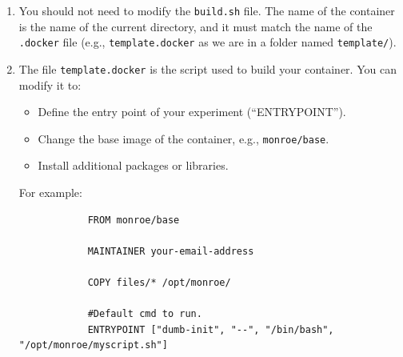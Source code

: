 \documentclass[a4paper,10pt]{article}
\newcommand{\VerbatimFont}{\footnotesize}
\newcommand{\monroe}{MONROE}
\newcommand{\identifier}[1]{{\texttt{\small{#1}}}}
\begin{document}
\begin{enumerate}
		Here, you will find the required files to prepare your image based on \monroe{}'s base.
		You should care about four things: a) The contents of the \identifier{files/} folder, b) the \identifier{build.sh} file, c) the \identifier{push.sh} file and d) the \identifier{template.docker} script file that describes how to create your container.
		In the directory \identifier{files/} you can put all the files that are part of your experiment.
		As a simple example, we can use the following script:
		{\VerbatimFont\begin{verbatim}
			$vi files/myscript.sh
			  #!/bin/bash
			  ls -lah > /monroe/results/listing.txt
		\end{verbatim}}
		Any files that your experiment creates in \identifier{/monroe/results} are delivered to the repository, where you will be able to retrieve them.
		\emph{Writes to any other part of the filesystem will be lost once the experiment is finished.}
		In periodic schedules, no data will survive from one execution to the next (i.e., the container is loaded fresh before each execution).
		If result persistence is needed, the experimenter will have to supply it by downloading the needed files from the network during the experiment itself.
	\item You should not need to modify the \identifier{build.sh} file. The name of the container is the name of the current directory, and it must match the name of the \identifier{.docker} file (e.g., \identifier{template.docker} as we are in a folder named \identifier{template/}).
	
	\item The file \identifier{template.docker} is the script used to build your container.
		You can modify it to:
		\begin{itemize}
			\item Define the entry point of your experiment (``ENTRYPOINT'').
			\item Change the base image of the container, e.g., \identifier{monroe/base}.
			\item Install additional packages or libraries.
		\end{itemize}
		For example:
		{\VerbatimFont\begin{verbatim}
			FROM monroe/base
		
			MAINTAINER your-email-address
		
			COPY files/* /opt/monroe/
		
			#Default cmd to run.
			ENTRYPOINT ["dumb-init", "--", "/bin/bash", "/opt/monroe/myscript.sh"]
		\end{verbatim}}
	

\end{enumerate}
\end{document}
